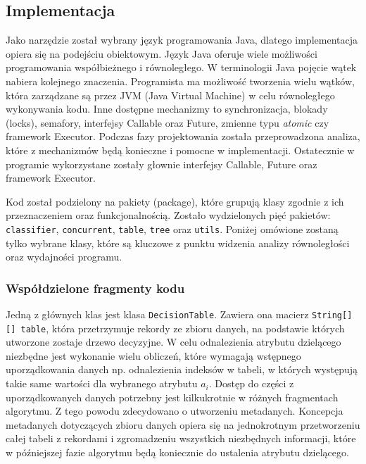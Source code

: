 \documentclass[12pt]{article}
\begin{document}
\subsection{Implementacja}

Jako narzędzie został wybrany język programowania Java, dlatego implementacja opiera się na podejściu
obiektowym. Język Java oferuje wiele możliwości programowania współbieżnego i równoległego. W terminologii Java
pojęcie wątek nabiera kolejnego znaczenia. Programista ma możliwość tworzenia wielu wątków, która zarządzane są
przez JVM (Java Virtual Machine) w celu równoległego wykonywania kodu. Inne dostępne mechanizmy to synchronizacja,
blokady (locks), semafory, interfejsy Callable oraz Future, zmienne typu \textit{atomic} czy framework Executor.
Podczas fazy projektowania została przeprowadzona analiza, które z mechanizmów będą konieczne i pomocne
w implementacji. Ostatecznie w programie wykorzystane zostały głownie interfejsy Callable, Future oraz framework Executor.

Kod został podzielony na pakiety (package), które grupują klasy zgodnie z ich przeznaczeniem oraz funkcjonalnością. Zostało wydzielonych pięć pakietów:
\verb|classifier|, \verb|concurrent|, \verb|table|, \verb|tree| oraz \verb|utils|. Poniżej omówione zostaną tylko wybrane klasy, które są kluczowe z
punktu widzenia analizy równoległości oraz wydajności programu.

\subsubsection{Współdzielone fragmenty kodu}\label{common-code-blocks}

Jedną z głównych klas jest klasa \verb|DecisionTable|. Zawiera ona macierz \verb|String[][] table|, która przetrzymuje rekordy ze zbioru danych,
na podstawie których utworzone zostaje drzewo decyzyjne. W celu odnalezienia atrybutu dzielącego niezbędne jest wykonanie wielu obliczeń, które wymagają 
wstępnego uporządkowania danych np. odnalezienia indeksów w tabeli, w których występują takie same wartości dla wybranego atrybutu $a_i$. 
Dostęp do części z uporządkowanych danych potrzebny jest kilkukrotnie w różnych fragmentach algorytmu. Z tego powodu zdecydowano o utworzeniu metadanych.
Koncepcja metadanych dotyczących zbioru danych opiera się na jednokrotnym przetworzeniu całej tabeli z rekordami i zgromadzeniu wszystkich niezbędnych
informacji, które w późniejszej fazie algorytmu będą koniecznie do ustalenia atrybutu dzielącego.
\end{document}
